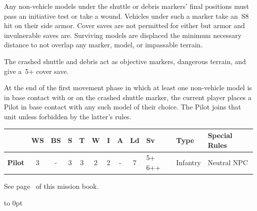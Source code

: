 \begin{missionrules}
  \smallskip Any non-vehicle models under the shuttle or debris
  markers' final positions must pass an initiative test or take a
  wound. Vehicles under such a marker take an~S8 hit on their side
  armor.  Cover saves are not permitted for either but armor and
  invulnerable saves are.  Surviving models are displaced the minimum
  necessary distance to not overlap any marker, model, or impassable
  terrain.

  \smallskip The crashed shuttle and debris act as objective markers,
  dangerous terrain, and give a~5+ cover save.

   At the end of the first movement
  phase in which at least one non-vehicle model is in base contact
  with or on the crashed shuttle marker, the current player places a
  Pilot in base contact with any such model of their choice.  The
  Pilot joins that unit unless forbidden by the latter's rules.

  \begin{center}    
  \begin{tabular}[t]{O{0.75in}ccccccccF{.25in}F{1in}E{2in}}
    & {\bf WS} &  {\bf BS} & {\bf S} & {\bf T} & {\bf W} & {\bf I} & {\bf A} & {\bf Ld} & {\bf Sv} & {\bf Type} & {\bf Special Rules}\\
\hline
    {\bf Pilot} & 3 & - & 3 & 3 & 2 & 2 & - & 7 & 5+ 6++ & Infantry & Neutral NPC\\
  \end{tabular}
  \end{center}

  \hfill
  \begin{minipage}{6in}
     See
    page~\pageref{rule:neutral-npc} of this mission book.
  \end{minipage}
  \hfill\hbox to 0pt{}

\end{missionrules}


